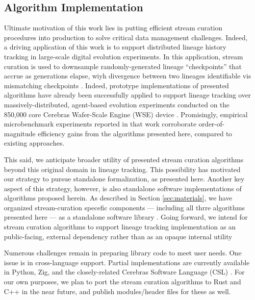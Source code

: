 \subsection{Algorithm Implementation}

Ultimate motivation of this work lies in putting efficient stream curation procedures into production to solve critical data management challenges.
Indeed, a driving application of this work is to support distributed lineage history tracking in large-scale digital evolution experiments.
In this application, stream curation is used to downsample randomly-generated lineage ``checkpoints'' that accrue as generations elapse, wiyh divergence between two lineages identifiable vis mismatching checkpoints \citep{moreno2022hereditary}.
Indeed, prototype implementations of presented algorithms have already been successfully applied to support lineage tracking over massively-distributed, agent-based evolution experiments conducted on the 850,000 core Cerebras Wafer-Scale Engine (WSE) device \citep{moreno2024wafer}.
Promisingly, empirical microbenchmark experiments reported in that work corroborate order-of-magnitude efficiency gains from the algorithms presented here, compared to existing approaches.

This said, we anticipate broader utility of presented stream curation algorithms beyond this original domain in lineage tracking.
This possibility has motivated our strategy to pursue standalone formalization, as presented here.
Another key aspect of this strategy, however, is also standalone software implementations of algorithms proposed herein.
As described in Section \ref{sec:materials}, we have organized stream-curation specefic components --- including all thrre algorithms presented here --- as a standalone software library \citep{moreno2024downstream}.
Going forward, we intend for stream curation algorithms to support lineage tracking implementation as an public-facing, external dependency rather than as an opaque internal utility \citep{moreno2022hstrat}

Numerous challenges remain in preparing library code to meet user needs.
One issue is in cross-language support.
Partial implementations are currently available in Python, Zig, and the closely-related Cerebras Software Language (CSL) \citep{YODO}.
For our own purposes, we plan to port the stream curation algorithms to Rust and C++ in the near future, and publish modules/header files for these as well.

